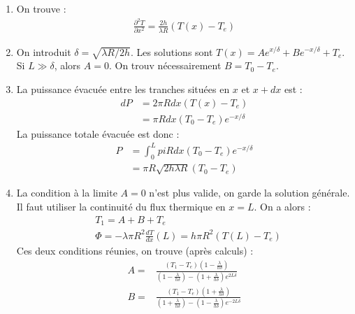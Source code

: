 \begin{correction}

\begin{enumerate}

	\item On trouve :
	\begin{align*}
		\frac{\partial^2 T}{\partial x^2} = \frac{2h}{\lambda R}(T(x)-T_e)
	\end{align*}
	
	\item On introduit $\delta=\sqrt{\lambda R/2h}$. Les solutions sont $T(x)=Ae^{x/\delta}+Be^{-x/\delta}+T_e$. Si $L\gg\delta$, alors $A=0$. On trouv nécessairement $B=T_0-T_e$.
	
	\item La puissance évacuée entre les tranches situées en $x$ et $x+dx$ est :
	\begin{align*}
		dP&=2\pi Rdx(T(x)-T_e) \\
		&=\pi Rdx(T_0-T_e)e^{-x/\delta}
	\end{align*}
	La puissance totale évacuée est donc :
	\begin{align*}
		P&=\int_0^L pi Rdx(T_0-T_e)e^{-x/\delta} \\
		&=\pi R\sqrt{2h\lambda R}(T_0-T_e)
	\end{align*}
	
	\item La condition à la limite $A=0$ n'est plus valide, on garde la solution générale. Il faut utiliser la continuité du flux thermique en $x=L$. On a alors :
	\begin{align*}
	& T_1=A+B+T_e \\
	& \Phi=-\lambda\pi R^2\frac{dT}{dx}(L)=h\pi R^2(T(L)-T_e)
	\end{align*}
Ces deux conditions réunies, on trouve (après calculs) :
\begin{align*}
	A=& \frac{(T_1-T_e)\left( 1-\frac{\lambda}{h\delta}\right) }{\left( 1-\frac{\lambda}{h\delta}\right) -\left( 1+\frac{\lambda}{h\delta}\right) e^{2L\delta}} \\
	B=&\frac{(T_1-T_e)\left( 1+\frac{\lambda}{h\delta}\right) }{\left( 1+\frac{\lambda}{h\delta}\right) -\left( 1-\frac{\lambda}{h\delta}\right) e^{-2L\delta}} 
\end{align*}

\end{enumerate}

\end{correction}

\newpage

